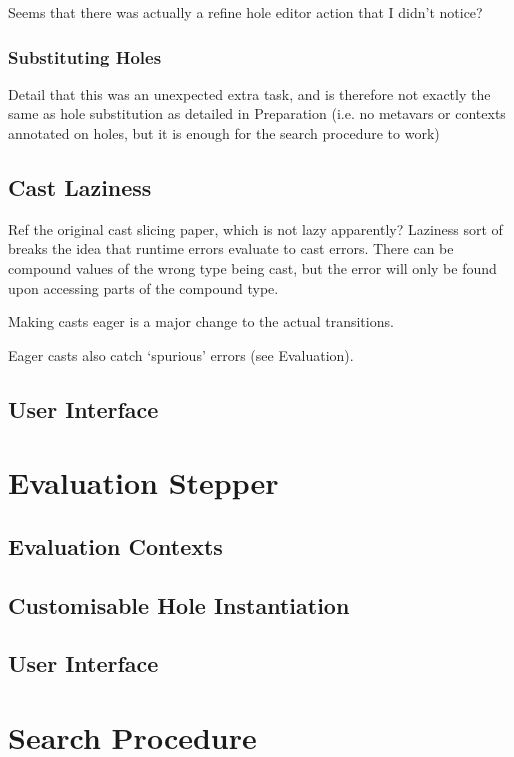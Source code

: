 Seems that there was actually a refine hole editor action that I didn't notice?

\subsubsection{Substituting Holes}\label{sec:HoleSubstitutionImplementation}
Detail that this was an unexpected extra task, and is therefore not exactly the same as hole substitution as detailed in Preparation (i.e. no metavars or contexts annotated on holes, but it is enough for the search procedure to work)

\subsection{Cast Laziness}\label{sec:CastLaziness}
Ref the original cast slicing paper, which is not lazy apparently? Laziness sort of breaks the idea that runtime errors evaluate to cast errors. There can be compound values of the wrong type being cast, but the error will only be found upon accessing parts of the compound type.

Making casts eager is a major change to the actual transitions.

Eager casts also catch `spurious' errors (see Evaluation).


\subsection{User Interface}

\section{Evaluation Stepper}\label{sec:Stepper}
\subsection{Evaluation Contexts}
\subsection{Customisable Hole Instantiation}
\subsection{User Interface}


\section{Search Procedure}\label{sec:SearchProcedure}
